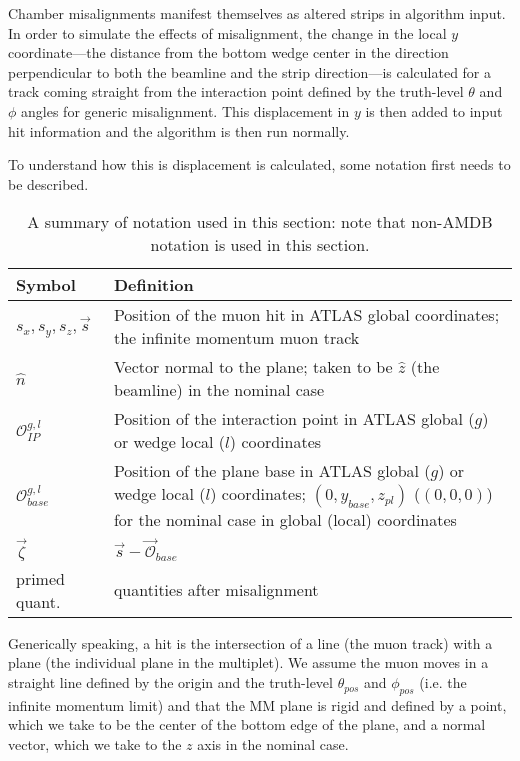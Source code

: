 Chamber misalignments manifest themselves as altered strips in algorithm input.  In order to simulate the effects of misalignment, the change in the local $y$ coordinate---the distance from the bottom wedge center in the direction perpendicular to both the beamline and the strip direction---is calculated for a track coming straight from the interaction point defined by the truth-level $\theta$ and $\phi$ angles for generic misalignment.  This displacement in $y$ is then added to input hit information and the algorithm is then run normally.

To understand how this is displacement is calculated, some notation first needs to be described.

\begin{table}[htbp]
\caption{A summary of notation used in this section: note that non-AMDB notation is used in this section.
\label{tab:misnotation}}
\begin{center}
\begin{tabular}{|l|p{13 cm}|}
\hline
Symbol & Definition\\
\hline
$s_x,s_y,s_z,\vec{s}$ & Position of the muon hit in ATLAS global coordinates; the infinite momentum muon track\\
\hline
$\hat{n}$ & Vector normal to the plane; taken to be $\hat{z}$ (the beamline) in the nominal case\\
\hline
$\mathscr{O}_{IP}^{g,l}$ & Position of the interaction point in ATLAS global ($g$) or wedge local ($l$) coordinates\\
\hline
$\mathscr{O}_{base}^{g,l}$ & Position of the plane base in ATLAS global ($g$) or wedge local ($l$) coordinates; $\left(0,y_{base},z_{pl}\right)$ ($\left(0,0,0\right)$) for the nominal case in global (local) coordinates\\
\hline
$\vec{\zeta}$ & $\vec{s}-\vec{\mathscr{O}}_{base}$\\
\hline
primed quant. & quantities after misalignment\\
\hline
\end{tabular}
\end{center}
\end{table}

Generically speaking, a hit is the intersection of a line (the muon track) with a plane (the individual plane in the multiplet).  We assume the muon moves in a straight line defined by the origin and the truth-level $\theta_{pos}$ and $\phi_{pos}$ (i.e. the infinite momentum limit) and that the MM plane is rigid and defined by a point, which we take to be the center of the bottom edge of the plane, and a normal vector, which we take to the $z$ axis in the nominal case.

